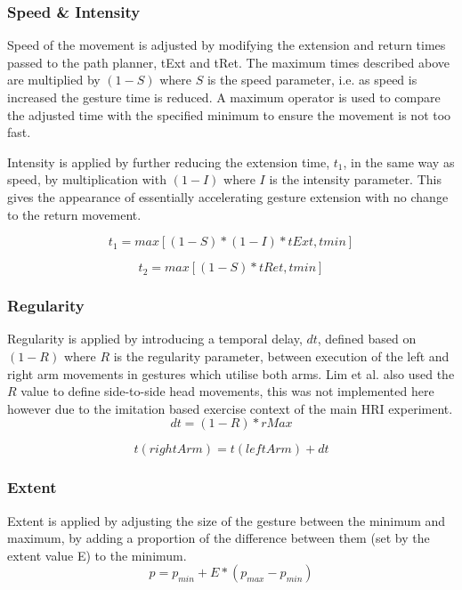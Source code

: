 \documentclass[11pt,a4paper]{report}
\begin{document}
\subsubsection{Speed \& Intensity}
Speed of the movement is adjusted by modifying the extension and return times passed to the path planner, tExt and tRet. The maximum times described above are multiplied by $(1-S)$ where $S$ is the speed parameter, i.e. as speed is increased the gesture time is reduced. A maximum operator is used to compare the adjusted time with the specified minimum to ensure the movement is not too fast.

Intensity is applied by further reducing the extension time, $t_{1}$, in the same way as speed, by multiplication with $(1-I)$ where $I$ is the intensity parameter. This gives the appearance of essentially accelerating gesture extension with no change to the return movement. 

\begin{equation}
t_{1} = max[(1-S)*(1-I)*tExt,tmin]
\end{equation}

\begin{equation}
t_{2} = max[(1-S)*tRet,tmin]
\end{equation}

\subsubsection{Regularity}
Regularity is applied by introducing a temporal delay, $dt$, defined based on $(1-R)$ where $R$ is the regularity parameter, between execution of the left and right arm movements in gestures which utilise both arms. Lim et al. \cite{lim2011converting} also used the $R$ value to define side-to-side head movements, this was not implemented here however due to the imitation based exercise context of the main HRI experiment. 
\begin{equation}
dt = (1-R)*rMax
\end{equation}

\begin{equation}
t(rightArm) = t(leftArm) + dt
\end{equation}

\subsubsection{Extent}
Extent is applied by adjusting the size of the gesture between the minimum and maximum, by adding a proportion of the difference between them (set by the extent value E) to the minimum. 
\begin{equation}
p = p_{min} + E*(p_{max} - p_{min})
\end{equation}
\end{document}
